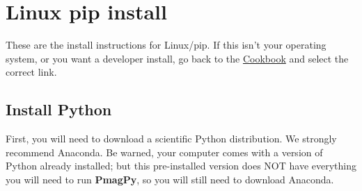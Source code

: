 \documentclass[11pt]{article}
\begin{document}
\tableofcontents


\section{Linux pip install}

These are the install instructions for Linux/pip.  If this isn't your operating system, or you want a developer install, go back to the \href{https://earthref.org/PmagPy/cookbook/#next_steps}{Cookbook} and select the correct link.


\subsection{Install Python}

First, you will need to download a scientific Python distribution.  We strongly recommend Anaconda.  Be warned, your computer comes with a version of Python already installed; but this pre-installed version does NOT have everything you will need to run {\bf PmagPy}, so you will still need to download Anaconda.
\end{document}
